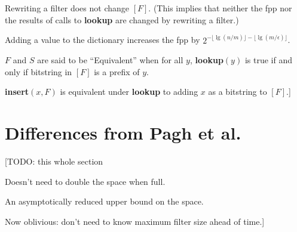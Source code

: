 \documentclass[11pt,letterpaper]{article}
\begin{document}
Rewriting a filter does not change $[F]$. (This implies that neither the fpp nor the results of calls to {\bf lookup} are changed by rewriting a filter.)

Adding a value to the dictionary increases the fpp by $2^{-\lfloor \lg (n/m) \rfloor - \lfloor \lg (m/\epsilon) \rfloor}$.

$F$ and $S$ are said to be ``Equivalent'' when for all $y$, {\bf lookup$(y)$} is true if and only if bitstring in $[F]$ is a prefix of $y$.

{\bf insert$(x, F)$} is equivalent under {\bf lookup} to adding $x$ as a bitstring to $[F]$.]

\section{Differences from Pagh et al.}

[TODO: this whole section

Doesn't need to double the space when full.

An asymptotically reduced upper bound on the space.

Now oblivious: don't need to know maximum filter size ahead of time.]

{}

%
\end{document}
